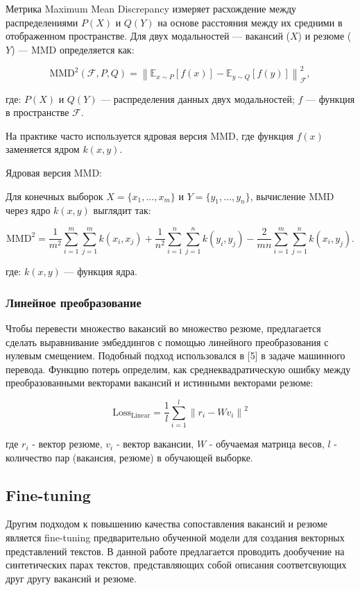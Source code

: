 \documentclass{article}
\begin{document}
Метрика Maximum Mean Discrepancy измеряет расхождение между распределениями \(P(X)\) и \(Q(Y)\) на основе расстояния между их средними в отображенном пространстве. Для двух модальностей — вакансий (\(X\)) и резюме (\(Y\)) — MMD определяется как:



\[
\text{MMD}^2(\mathcal{F}, P, Q) = \left\| \mathbb{E}_{x \sim P} [f(x)] - \mathbb{E}_{y \sim Q} [f(y)] \right\|^2_{\mathcal{F}},
\]

где:
\(P(X)\) и \(Q(Y)\) — распределения данных двух модальностей;
\(f\) — функция в пространстве \(\mathcal{F}\).

На практике часто используется ядровая версия MMD, где функция \(f(x)\) заменяется ядром \(k(x, y)\).

Ядровая версия MMD:

Для конечных выборок \(X = \{x_1, \dots, x_m\}\) и \(Y = \{y_1, \dots, y_n\}\), вычисление MMD через ядро \(k(x, y)\) выглядит так:

\[
\text{MMD}^2 = \frac{1}{m^2} \sum_{i=1}^m \sum_{j=1}^m k(x_i, x_j) + \frac{1}{n^2} \sum_{i=1}^n \sum_{j=1}^n k(y_i, y_j) - \frac{2}{mn} \sum_{i=1}^m \sum_{j=1}^n k(x_i, y_j).
\]

где: \(k(x, y)\) — функция ядра.

\subsubsection{Линейное преобразование}

Чтобы перевести множество вакансий во множество резюме, предлагается сделать выравнивание эмбеддингов с помощью линейного преобразования с нулевым смещением. Подобный подход использовался в [5] в задаче машинного перевода. Функцию потерь определим, как среднеквадратическую ошибку между преобразованными векторами вакансий и истинными векторами резюме:

\[ \text{Loss}_{\text{Linear}} = \frac{1}{l} \sum_{i=1}^{l} \left\| r_i - W v_i  \right\|^2  \]

где \(r_i\) - вектор резюме, \(v_i\) - вектор вакансии, \(W\) - обучаемая матрица весов, \(l\) - количество пар (вакансия, резюме) в обучающей выборке.


\subsection{Fine-tuning} 

Другим подходом к повышению качества сопоставления вакансий и резюме является fine-tuning предварительно обученной модели для создания векторных представлений текстов. В данной работе предлагается проводить дообучение на синтетических парах текстов, представляющих собой описания соответсвующих друг другу вакансий и резюме.
\end{document}

